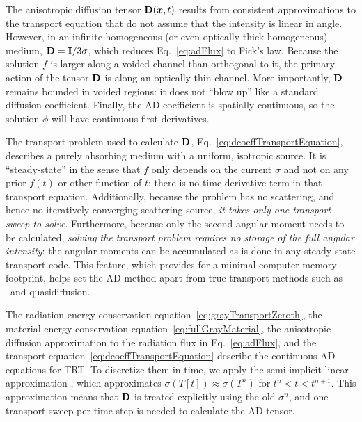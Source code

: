 \documentclass[11pt,letter,twoside]{mc2011}
\newcommand{\Dtens}{\mat{D}}
\begin{document}
The anisotropic diffusion tensor $\Dtens(\vec{x},t)$ results from consistent
approximations to the transport equation that do not assume that the intensity
is linear in angle. However, in an infinite homogeneous (or even optically
thick homogeneous) medium, $\Dtens = \mat{I}/3\sigma$, which reduces
Eq.~\eqref{eq:adFlux} to Fick's law. Because the solution $f$ is larger along a
voided channel than orthogonal to it, the primary action of the tensor $\Dtens$
is along an optically thin channel. More importantly, $\Dtens$ remains bounded
in voided regions: it does not ``blow up'' like a standard diffusion
coefficient. Finally, the AD coefficient is spatially continuous, so the
solution $\phi$ will have continuous first derivatives.

The transport problem used to calculate $\Dtens$,
Eq.~\eqref{eq:dcoeffTransportEquation}, describes a purely absorbing medium
with a uniform, isotropic source. It is ``steady-state'' in the sense that $f$
only depends on the current $\sigma$ and not on any prior $f(t)$ or other
function of $t$; there is no time-derivative term in that transport equation.
Additionally, because the problem has no
scattering, and hence no iteratively converging scattering source, \emph{it
takes only one transport sweep to solve}. Furthermore, because only the second
angular moment needs to be calculated, \emph{solving the transport problem
requires no storage of the full angular intensity}: the angular moments can be
accumulated as is done in any steady-state transport code. This feature, which
provides for a minimal computer memory footprint, helps set the AD method apart
from true transport methods such as \SN\ and quasidiffusion.


The radiation energy conservation equation~\eqref{eq:grayTransportZeroth}, the
material energy conservation equation~\eqref{eq:fullGrayMaterial}, the
anisotropic diffusion approximation to the radiation flux in
Eq.~\eqref{eq:adFlux}, and the transport
equation~\eqref{eq:dcoeffTransportEquation} describe the continuous AD
equations for TRT. To discretize them in time, we apply the semi-implicit
linear approximation \cite{Lar1988}, which approximates $\sigma(T[t]) \approx
\sigma(T^n)$ for $t^n < t < t^{n+1}$. This approximation means that $\Dtens$ is
treated explicitly using the old $\sigma^n$, and one transport sweep per time
step is needed to calculate the AD tensor.
\end{document}
